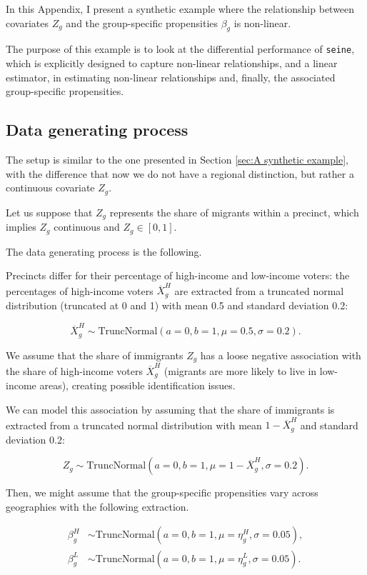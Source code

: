 In this Appendix, I present a synthetic example where the relationship between covariates $Z_g$ and the group-specific propensities $\beta_g$ is non-linear. 

The purpose of this example is to look at the differential performance of \texttt{seine}, which is explicitly designed to capture non-linear relationships, and a linear estimator, in estimating non-linear relationships and, finally, the associated group-specific propensities.

\subsection{Data generating process}

The setup is similar to the one presented in Section \ref{sec:A synthetic example}, with the difference that now we do not have a regional distinction, but rather a continuous covariate $Z_g$.

Let us suppose that $Z_g$ represents the share of migrants within a precinct, which implies $Z_g$ continuous and $Z_g\in [0,1]$.

The data generating process is the following.

Precincts differ for their percentage of high-income and low-income voters: the percentages of high-income voters $\overline{X}_g^H$ are extracted from a truncated normal distribution (truncated at 0 and 1) with mean 0.5 and standard deviation 0.2:

\[
\overline{X}_g^H \sim \text{TruncNormal}(a=0, b=1, \mu=0.5, \sigma=0.2).
\]

We assume that the share of immigrants $Z_g$ has a loose negative association with the share of high-income voters $\overline{X}_g^H$ (migrants are more likely to live in low-income areas), creating possible identification issues.

We can model this association by assuming that the share of immigrants is extracted from a truncated normal distribution with mean $1-\overline{X}_g^H$ and standard deviation 0.2:

\[
Z_g \sim \text{TruncNormal}(a=0, b=1, \mu=1-\overline{X}_g^H, \sigma=0.2).
\]

Then, we might assume that the group-specific propensities vary across geographies with the following extraction.

\begin{align*}
\beta_{g}^{H} &\sim \text{TruncNormal}(a=0, b=1, \mu=\eta_{g}^{H}, \sigma=0.05), \\
\beta_{g}^{L} &\sim \text{TruncNormal}(a=0, b=1, \mu=\eta_{g}^{L}, \sigma=0.05).
\end{align*}

